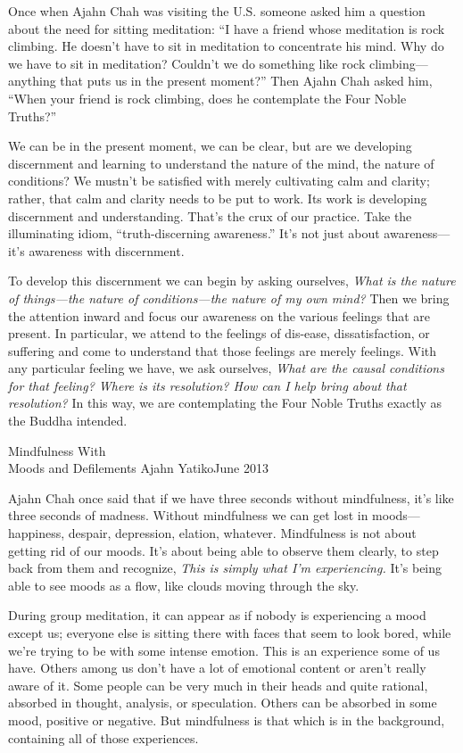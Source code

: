 Once when Ajahn Chah was visiting the U.S. someone asked him a question 
about the need for sitting meditation: ``I have a friend whose 
meditation is rock climbing. He doesn't have to sit in meditation to 
concentrate his mind. Why do we have to sit in meditation? Couldn't we 
do something like rock climbing---anything that puts us in the present 
moment?'' Then Ajahn Chah asked him, ``When your friend is rock 
climbing, does he contemplate the Four Noble Truths?''

We can be in the present moment, we can be clear, but are we developing 
discernment and learning to understand the nature of the mind, the 
nature of conditions? We mustn't be satisfied with merely cultivating 
calm and clarity; rather, that calm and clarity needs to be put to 
work. Its work is developing discernment and understanding. That's the 
crux of our practice. Take the illuminating idiom, ``truth-discerning 
awareness.'' It's not just about awareness---it's awareness with 
discernment.

To develop this discernment we can begin by asking ourselves, 
\emph{What is the nature of things---the nature of conditions---the 
nature of my own mind?} Then we bring the attention inward and focus 
our awareness on the various feelings that are present. In particular, 
we attend to the feelings of dis-ease, dissatisfaction, or suffering 
and come to understand that those feelings are merely feelings. With 
any particular feeling we have, we ask ourselves, \emph{What are the 
causal conditions for that feeling? Where is its resolution? How can I 
help bring about that resolution?} In this way, we are contemplating 
the Four Noble Truths exactly as the Buddha intended.

{Mindfulness With\\Moods and Defilements}
{Ajahn Yatiko}{June 2013}

Ajahn Chah once said that if we have three seconds without mindfulness, 
it's like three seconds of madness. Without mindfulness we can get lost 
in moods---happiness, despair, depression, elation, whatever. 
Mindfulness is not about getting rid of our moods. It's about being 
able to observe them clearly, to step back from them and recognize, 
\emph{This is simply what I'm experiencing.} It's being able to see 
moods as a flow, like clouds moving through the sky.

During group meditation, it can appear as if nobody is experiencing a 
mood except us; everyone else is sitting there with faces that seem to 
look bored, while we're trying to be with some intense emotion. This is 
an experience some of us have. Others among us don't have a lot of 
emotional content or aren't really aware of it. Some people can be very 
much in their heads and quite rational, absorbed in thought, analysis, 
or speculation. Others can be absorbed in some mood, positive or 
negative. But mindfulness is that which is in the background, 
containing all of those experiences.

